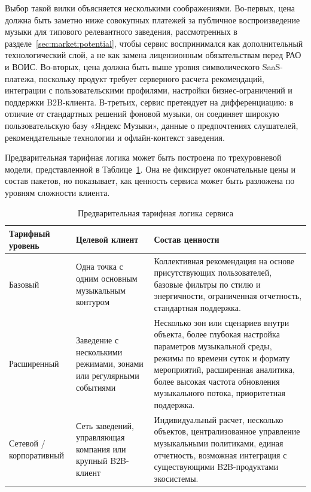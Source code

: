 Выбор такой вилки объясняется несколькими соображениями. Во-первых, цена должна быть заметно ниже совокупных платежей за публичное воспроизведение музыки для типового релевантного заведения, рассмотренных в разделе~\ref{sec:market:potential}, чтобы сервис воспринимался как дополнительный технологический слой, а не как замена лицензионным обязательствам перед РАО и ВОИС. Во-вторых, цена должна быть выше уровня символического SaaS-платежа, поскольку продукт требует серверного расчета рекомендаций, интеграции с пользовательскими профилями, настройки бизнес-ограничений и поддержки B2B-клиента. В-третьих, сервис претендует на дифференциацию: в отличие от стандартных решений фоновой музыки, он соединяет широкую пользовательскую базу «Яндекс Музыки», данные о предпочтениях слушателей, рекомендательные технологии и офлайн-контекст заведения.

Предварительная тарифная логика может быть построена по трехуровневой модели, представленной в Таблице~\ref{tab:service:tariffs}. Она не фиксирует окончательные цены и состав пакетов, но показывает, как ценность сервиса может быть разложена по уровням сложности клиента.

\begin{table}[htbp]
\centering
\small
\caption{Предварительная тарифная логика сервиса}
\label{tab:service:tariffs}
\begin{tabularx}{\textwidth}{p{}p{}X}
\toprule
Тарифный уровень & Целевой клиент & Состав ценности \\
\midrule
Базовый & Одна точка с одним основным музыкальным контуром & Коллективная рекомендация на основе присутствующих пользователей, базовые фильтры по стилю и энергичности, ограниченная отчетность, стандартная поддержка. \\
\addlinespace
Расширенный & Заведение с несколькими режимами, зонами или регулярными событиями & Несколько зон или сценариев внутри объекта, более глубокая настройка параметров музыкальной среды, режимы по времени суток и формату мероприятий, расширенная аналитика, более высокая частота обновления музыкального потока, приоритетная поддержка. \\
\addlinespace
Сетевой / корпоративный & Сеть заведений, управляющая компания или крупный B2B-клиент & Индивидуальный расчет, несколько объектов, централизованное управление музыкальными политиками, единая отчетность, возможная интеграция с существующими B2B-продуктами экосистемы. \\
\bottomrule
\end{tabularx}
\end{table}

